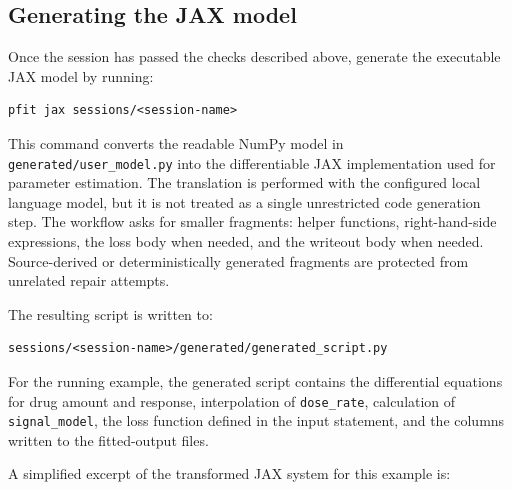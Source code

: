 \subsection{Generating the JAX model}

Once the session has passed the checks described above, generate the executable
JAX model by running:

\begin{verbatim}
pfit jax sessions/<session-name>
\end{verbatim}

This command converts the readable NumPy model in
\texttt{generated/user\_model.py} into the differentiable JAX implementation
used for parameter estimation. The translation is performed with the configured
local language model, but it is not treated as a single unrestricted code
generation step. The workflow asks for smaller fragments: helper functions,
right-hand-side expressions, the loss body when needed, and the writeout body
when needed. Source-derived or deterministically generated fragments are
protected from unrelated repair attempts.

The resulting script is written to:

\begin{verbatim}
sessions/<session-name>/generated/generated_script.py
\end{verbatim}

For the running example, the generated script contains the differential
equations for drug amount and response, interpolation of
\texttt{dose\_rate}, calculation of \texttt{signal\_model}, the loss function
defined in the input statement, and the columns written to the fitted-output
files.

A simplified excerpt of the transformed JAX system for this example is:


